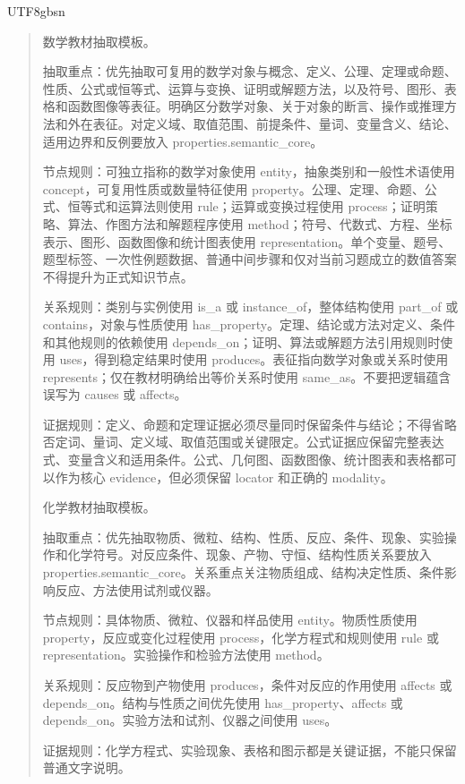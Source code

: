 \documentclass[11pt,letterpaper]{article}
\newenvironment{prompttranscript}{%
\begin{CJK}{UTF8}{gbsn}%
\begin{quote}%
\small%
\sloppy%
\setlength{\parskip}{0.35em}%
\setlength{\parindent}{0pt}%
}{%
\end{quote}%
\end{CJK}%
}
\newenvironment{prompttranscript}{%
\begin{quote}%
\small%
\sloppy%
\setlength{\parskip}{0.35em}%
\setlength{\parindent}{0pt}%
}{%
\end{quote}%
}
\begin{document}
\begin{prompttranscript}
数学教材抽取模板。\par
抽取重点：优先抽取可复用的数学对象与概念、定义、公理、定理或命题、性质、公式或恒等式、运算与变换、证明或解题方法，以及符号、图形、表格和函数图像等表征。明确区分数学对象、关于对象的断言、操作或推理方法和外在表征。对定义域、取值范围、前提条件、量词、变量含义、结论、适用边界和反例要放入 properties.semantic\_core。\par
节点规则：可独立指称的数学对象使用 entity，抽象类别和一般性术语使用 concept，可复用性质或数量特征使用 property。公理、定理、命题、公式、恒等式和运算法则使用 rule；运算或变换过程使用 process；证明策略、算法、作图方法和解题程序使用 method；符号、代数式、方程、坐标表示、图形、函数图像和统计图表使用 representation。单个变量、题号、题型标签、一次性例题数据、普通中间步骤和仅对当前习题成立的数值答案不得提升为正式知识节点。\par
关系规则：类别与实例使用 is\_a 或 instance\_of，整体结构使用 part\_of 或 contains，对象与性质使用 has\_property。定理、结论或方法对定义、条件和其他规则的依赖使用 depends\_on；证明、算法或解题方法引用规则时使用 uses，得到稳定结果时使用 produces。表征指向数学对象或关系时使用 represents；仅在教材明确给出等价关系时使用 same\_as。不要把逻辑蕴含误写为 causes 或 affects。\par
证据规则：定义、命题和定理证据必须尽量同时保留条件与结论；不得省略否定词、量词、定义域、取值范围或关键限定。公式证据应保留完整表达式、变量含义和适用条件。公式、几何图、函数图像、统计图表和表格都可以作为核心 evidence，但必须保留 locator 和正确的 modality。\par

化学教材抽取模板。\par
抽取重点：优先抽取物质、微粒、结构、性质、反应、条件、现象、实验操作和化学符号。对反应条件、现象、产物、守恒、结构性质关系要放入 properties.semantic\_core。关系重点关注物质组成、结构决定性质、条件影响反应、方法使用试剂或仪器。\par
节点规则：具体物质、微粒、仪器和样品使用 entity。物质性质使用 property，反应或变化过程使用 process，化学方程式和规则使用 rule 或 representation。实验操作和检验方法使用 method。\par
关系规则：反应物到产物使用 produces，条件对反应的作用使用 affects 或 depends\_on。结构与性质之间优先使用 has\_property、affects 或 depends\_on。实验方法和试剂、仪器之间使用 uses。\par
证据规则：化学方程式、实验现象、表格和图示都是关键证据，不能只保留普通文字说明。\par


\end{prompttranscript}
\end{document}
